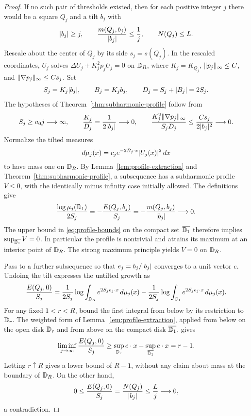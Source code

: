 \begin{proof}
If no such pair of thresholds existed, then for each positive integer
\(j\) there would be a square \(Q_j\) and a tilt \(b_j\) with
\[
 \lvert b_j\rvert\ge j,\qquad
 \frac{m(Q_j,b_j)}{\lvert b_j\rvert}\le\frac1j,\qquad
 N(Q_j)\le L.
\]
Rescale about the center of \(Q_j\) by its side \(s_j=s(Q_j)\).
In the rescaled coordinates, \(U_j\) solves
\(\Delta U_j+K_j^2p_jU_j=0\) on \(\mathbb D_R\), where
\(K_j=K_{Q_j}\), \(\lVert p_j\rVert_\infty\le C\), and
\(\lVert\nabla p_j\rVert_\infty\le Cs_j\).
Set
\[
 S_j=K_j\lvert b_j\rvert,\qquad B_j=K_jb_j,\qquad
 D_j=S_j+\lvert B_j\rvert=2S_j.
\]
The hypotheses of Theorem~\ref{thm:subharmonic-profile} follow from
\[
 S_j\ge a_0j\longrightarrow\infty,\qquad
 \frac{K_j}{D_j}=\frac1{2\lvert b_j\rvert}\longrightarrow0,\qquad
 \frac{K_j^2\lVert\nabla p_j\rVert_\infty}{S_jD_j}
 \le\frac{Cs_j}{2\lvert b_j\rvert^2}\longrightarrow0.
\]
Normalize the tilted measures
\[
 d\mu_j(x)=c_j e^{-2B_j\cdot x}\lvert U_j(x)\rvert^2\,dx
\]
to have mass one on \(\mathbb D_R\).  By
Lemma~\ref{lem:profile-extraction} and
Theorem~\ref{thm:subharmonic-profile}, a subsequence has a
subharmonic profile \(V\le0\), with the identically minus infinity
case initially allowed.  The definitions give
\[
 \frac{\log\mu_j(\mathbb D_1)}{2S_j}
 =-\frac{E(Q_j,b_j)}{S_j}
 =-\frac{m(Q_j,b_j)}{\lvert b_j\rvert}\longrightarrow0.
\]
The upper bound in \eqref{eq:profile-bounds} on the compact set
\(\overline{\mathbb D_1}\) therefore implies
\(\sup_{\overline{\mathbb D_1}}V=0\).
In particular the profile is nontrivial and attains its maximum at
an interior point of \(\mathbb D_R\).  The strong maximum principle yields
\(V=0\) on \(\mathbb D_R\).

Pass to a further subsequence so that
\(e_j=b_j/\lvert b_j\rvert\) converges to a unit vector \(e\).
Undoing the tilt expresses the untilted growth as
\[
 \frac{E(Q_j,0)}{S_j}
 =
 \frac{1}{2S_j}\log
       \int_{\mathbb D_R}e^{2S_je_j\cdot x}\,d\mu_j(x)
 -
 \frac{1}{2S_j}\log
       \int_{\mathbb D_1}e^{2S_je_j\cdot x}\,d\mu_j(x).
\]
For any fixed \(1<r<R\), bound the first integral from below by its
restriction to \(\mathbb D_r\).  The weighted form of
Lemma~\ref{lem:profile-extraction}, applied from below on the open
disk \(\mathbb D_r\) and from above on the compact disk
\(\overline{\mathbb D_1}\), gives
\[
 \liminf_{j\to\infty}\frac{E(Q_j,0)}{S_j}
 \ge
 \sup_{\mathbb D_r} e\cdot x
 -\sup_{\overline{\mathbb D_1}} e\cdot x
 =r-1.
\]
Letting \(r\uparrow R\) gives a lower bound of \(R-1\), without any
claim about mass at the boundary of \(\mathbb D_R\).  On the other hand,
\[
 0\le\frac{E(Q_j,0)}{S_j}
 =\frac{N(Q_j)}{\lvert b_j\rvert}
 \le\frac{L}{j}\longrightarrow0,
\]
a contradiction.
\end{proof}

